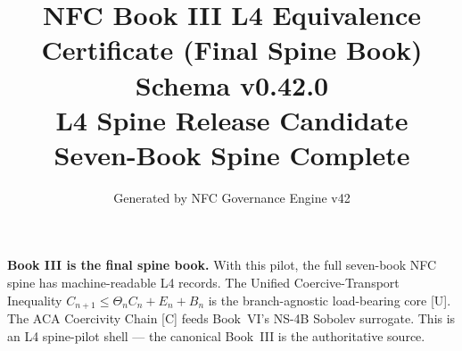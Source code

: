 \documentclass[11pt]{article}
\title{NFC Book III L4 Equivalence Certificate (Final Spine Book)\\[1ex]\large Schema v0.42.0\\[0.5ex]
\normalsize L4 Spine Release Candidate\\[0.5ex]
\small Seven-Book Spine Complete}
\author{Generated by NFC Governance Engine v42}
\date{}
\begin{document}
\maketitle
\tableofcontents
\bigskip
\noindent\textbf{Book III is the final spine book.} With this pilot, the full
seven-book NFC spine has machine-readable L4 records.
The Unified Coercive-Transport Inequality $C_{n+1} \leq \Theta_n C_n + E_n + B_n$
is the branch-agnostic load-bearing core [U].
The ACA Coercivity Chain [C] feeds Book~VI's NS-4B Sobolev surrogate.
This is an L4 spine-pilot shell --- the canonical Book~III is the authoritative source.
\vspace{1em}

\end{document}
